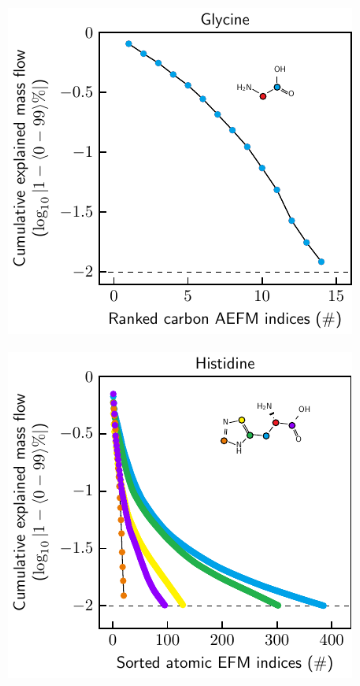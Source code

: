 \documentclass[]{article}
\begin{document}
\begin{figure}
    \begin{subfigure}[t]{0.247\textwidth}
        \caption{}
        \includegraphics[width=\textwidth]{subpanels/cumulative-source-met-15-log.pdf}\\
    \end{subfigure}
    \begin{subfigure}[t]{0.247\textwidth}
        \caption{}
        \includegraphics[width=\textwidth]{subpanels/cumulative-source-met-18-log.pdf}\\

\end{subfigure}
\end{figure}
\end{document}
